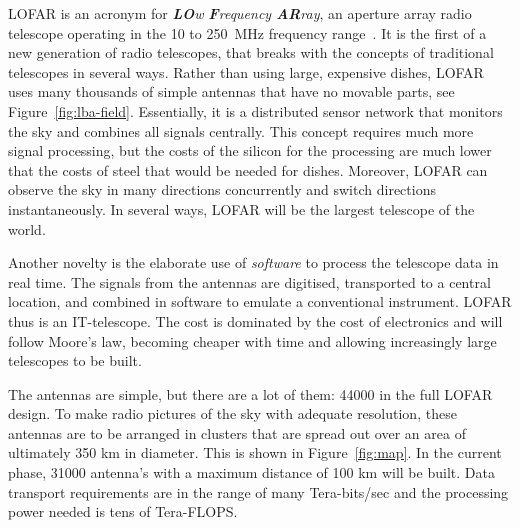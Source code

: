 \documentclass{article}
\newcommand{\longversion}[1]{}
\begin{document}
LOFAR is an acronym for \emph{\textbf{LO}w \textbf{F}requency
  \textbf{AR}ray}, an aperture array radio telescope operating in the
10 to 250~MHz frequency range~\cite{Butcher:04}.  It is the first of a new generation of
radio telescopes, that breaks with the concepts of traditional
telescopes in several ways.  Rather than using large, expensive
dishes, LOFAR uses many thousands of simple antennas that have no
movable parts, see
Figure~\ref{fig:lba-field}.  Essentially, it is a distributed sensor
network that monitors the sky and combines all signals centrally.
This concept requires much more signal processing, but the 
costs of the silicon for the processing are much lower that the costs of steel that would
be needed for dishes. Moreover, LOFAR can observe the sky in many
directions concurrently and switch directions instantaneously.  In
several ways, LOFAR will be the largest telescope of the world.

Another novelty is the elaborate
use of \emph{software\/} to process the telescope data in real time.
The signals from the
antennas are digitised, transported to a central location,
and combined in software to emulate a conventional instrument. 
LOFAR thus is an IT-telescope. 
The cost
is dominated by the cost of electronics and will follow Moore's law,
becoming cheaper with time and allowing increasingly large telescopes
to be built. 

The antennas are simple, but there are a lot of them: 44000 in the full LOFAR
design. To make radio pictures of the sky with adequate resolution,
these antennas are to be arranged in clusters that are spread out over
an area of ultimately 350 km in diameter. This is shown in Figure~\ref{fig:map}.
In the current phase, 31000
antenna's with a maximum distance of 100 km will
be built. Data transport requirements are in the range of many
Tera-bits/sec and the processing power needed is tens of Tera-FLOPS.

\longversion{
LOFAR will enable exciting new science cases.  First, we expect to see
the \emph{Epoch of Reionization\/} (EoR), the time that the first star
galaxies and quasars were formed. Second, LOFAR offers a unique
possibility in particle astrophysics for studying the origin of
high-energy \emph{cosmic rays}.  Third, LOFAR's ability to
continuously monitor a large fraction of the sky makes it uniquely
suited to find new \emph{pulsars} and to study \emph{transient
  sources}.  Since LOFAR has no moving parts, it can instantaneously
switch focus to some galactic event.  Fourth, \emph{Deep Extragalactic
  Surveys\/} will be carried out to find the most distant radio
galaxies and study star-forming galaxies.  Fifth, LOFAR will be
capable of observing the so far unexplored radio waves emitted by
\emph{cosmic magnetic fields}.  For a more extensive description of
the astronomical aspects of the LOFAR system, see De Bruyn
et.~al.~\cite{Bruyn:02}.
}
\end{document}
